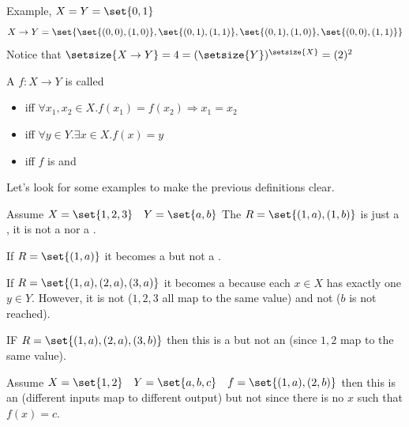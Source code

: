 

Example, $X = Y = \set{0,1}$
\[
X \to Y = \set{\set{(0,0),(1,0)}, \set{(0,1),(1,1)}, \set{(0,1), (1,0)}, \set{(0,0), (1,1)}}
\]
Notice that $\setsize{X \to Y} = 4 = (\setsize{Y})^{\setsize{X}} = (2)^{2}$




A  $f: X \to Y$ is called
\begin{itemize}
\item {} iff $\forall x_1,x_2 \in X.f(x_1) = f(x_2) \Rightarrow x_1 = x_2$
\item {} iff $\forall y \in Y. \exists x \in X.f(x)=y$
\item {} iff $f$ is  and  
\end{itemize}

Let's look for some examples to make the previous definitions clear. 

Assume $X = \set{1,2,3} \quad Y = \set{a,b}$ The  $R=\set{(1,a), (1,b)}$ is just a , it is not a  nor a .

If $R = \set{(1,a)}$ it becomes a  but not a .

If $R = \set{(1,a),(2,a),(3,a)}$ it becomes a  because each $x \in X$ has exactly one $y \in Y$. However, it is not  ($1,2,3$ all map to the same value) and not  ($b$ is not reached).

IF $R = \set{(1,a),(2,a),(3,b)}$ then this is a   but not an  (since $1,2$ map to the same value).

Assume $X = \set{1,2} \quad Y=\set{a,b,c} \quad f = \set{(1,a),(2,b)}$ then this is an   (different inputs map to different output) but not  since there is no $x$ such that  $f(x) = c$.


